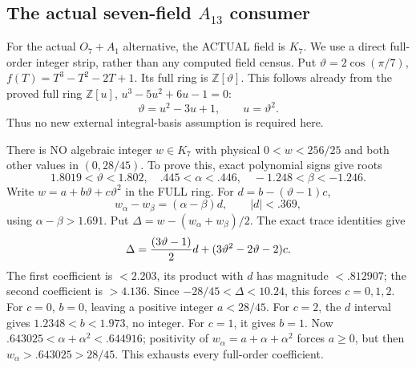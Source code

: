 \documentclass[11pt]{article}
\begin{document}
\subsection{The actual seven-field \(A_{13}\) consumer}
\label{app:arithA13seven}

For the actual \(O_7+A_1\) alternative,
the ACTUAL field is \(K_7\).
We use a direct full-order integer strip,
rather than any computed field census.
Put \(\vartheta=2\cos(\pi/7)\),
\(f(T)=T^3-T^2-2T+1\).
Its full ring is \(\mathbb Z[\vartheta]\).
This follows already from the proved full ring
\(\mathbb Z[u]\), \(u^3-5u^2+6u-1=0\):
\[
                    \vartheta=u^2-3u+1,\qquad u=\vartheta^2 .
\]
Thus no new external integral-basis assumption
is required here.

There is NO algebraic integer \(w\in K_7\)
with physical \(0<w<256/25\) and both other
values in \((0,28/45)\).
To prove this, exact polynomial signs give roots
\[
 1.8019<\vartheta<1.802,\quad .445<\alpha<.446,\quad
                         -1.248<\beta<-1.246 .
\]
Write \(w=a+b\vartheta+c\vartheta^2\) in
the FULL ring.
For \(d=b-(\vartheta-1)c\),
\[
             w_\alpha-w_\beta=(\alpha-\beta)d,\qquad |d|<.369 ,
\]
using \(\alpha-\beta>1.691\).
Put \(\Delta=w-(w_\alpha+w_\beta)/2\).
The exact trace identities give
\[
 \Delta={(3\vartheta-1)\over2}d+
                     (3\vartheta^2-2\vartheta-2)c.
\]
The first coefficient is \(<2.203\), its product
with \(d\) has magnitude \(<.812907\);
the second coefficient is \(>4.136\).
Since \(-28/45<\Delta<10.24\), this forces
\(c=0,1,2\).
For \(c=0\), \(b=0\), leaving a positive integer
\(a<28/45\).
For \(c=2\), the \(d\) interval gives
\(1.2348<b<1.973\), no integer.
For \(c=1\), it gives \(b=1\).
Now
\(.643025<\alpha+\alpha^2<.644916\);
positivity of \(w_\alpha=a+\alpha+\alpha^2\)
forces \(a\ge0\), but then
\(w_\alpha>.643025>28/45\).
This exhausts every full-order coefficient.
\end{document}
